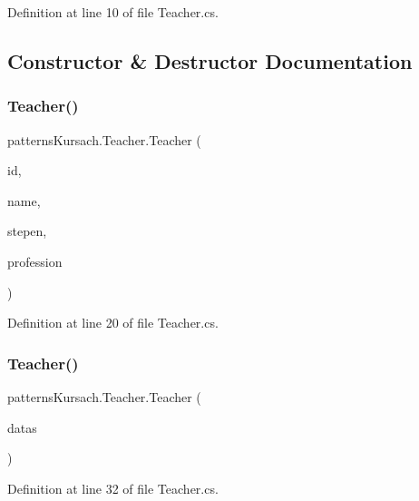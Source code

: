 Definition at line 10 of file Teacher.\+cs.



\subsection{Constructor \& Destructor Documentation}
\mbox{\label{classpatterns_kursach_1_1_teacher_a46e92b2e9bbf73eca909a705124d38a6}} 
\subsubsection{\texorpdfstring{Teacher()}{Teacher()}\hspace{0.1cm}{\footnotesize\ttfamily [1/2]}}
{\footnotesize\ttfamily patterns\+Kursach.\+Teacher.\+Teacher (\begin{DoxyParamCaption}\item[{int}]{id,  }\item[{string}]{name,  }\item[{string}]{stepen,  }\item[{string}]{profession }\end{DoxyParamCaption})}



Definition at line 20 of file Teacher.\+cs.

\mbox{\label{classpatterns_kursach_1_1_teacher_a255a7c62cd79160a16dae729d19fdaf5}} 
\subsubsection{\texorpdfstring{Teacher()}{Teacher()}\hspace{0.1cm}{\footnotesize\ttfamily [2/2]}}
{\footnotesize\ttfamily patterns\+Kursach.\+Teacher.\+Teacher (\begin{DoxyParamCaption}\item[{Data\+Row}]{datas }\end{DoxyParamCaption})}



Definition at line 32 of file Teacher.\+cs.



